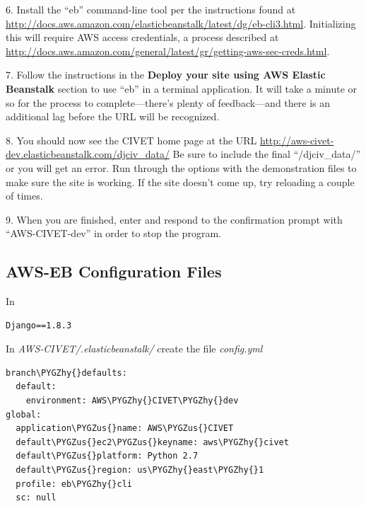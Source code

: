 \documentclass[letterpaper,10pt,english]{sphinxmanual}
\def\PYGZus{\char`\_}
\def\PYGZhy{\char`\-}
\begin{document}
6. Install the “eb” command-line tool per the instructions found at
\href{http://docs.aws.amazon.com/elasticbeanstalk/latest/dg/eb-cli3.html}{http://docs.aws.amazon.com/elasticbeanstalk/latest/dg/eb-cli3.html}. Initializing this will require AWS access credentials, a
process described at \href{http://docs.aws.amazon.com/general/latest/gr/getting-aws-sec-creds.html}{http://docs.aws.amazon.com/general/latest/gr/getting-aws-sec-creds.html}.

7. Follow the instructions in the \textbf{Deploy your site using AWS Elastic Beanstalk} section to use “eb” in a terminal
application. It will take a minute or so for the  process to complete—there's plenty of feedback—and there is an
additional lag before the URL will be recognized.

8. You should now see the CIVET home page at the URL \href{http://aws-civet-dev.elasticbeanstalk.com/djciv\_data/}{http://aws-civet-dev.elasticbeanstalk.com/djciv\_data/} Be sure to include
the final “/djciv\_data/'' or you will get an error. Run through the options with the demonstration files to make sure
the site is working. If the site doesn't come up, try reloading a couple of times.

9. When you are finished, enter  and respond to the confirmation prompt with “AWS-CIVET-dev” in order to
stop the program.


\subsection{AWS-EB Configuration Files}
\label{appendix5:aws-eb-configuration-files}
In

\begin{Verbatim}[commandchars=\\\{\}]
Django==1.8.3
\end{Verbatim}

In \emph{AWS-CIVET/.elasticbeanstalk/} create the file \emph{config.yml}

\begin{Verbatim}[commandchars=\\\{\}]
branch\PYGZhy{}defaults:
  default:
    environment: AWS\PYGZhy{}CIVET\PYGZhy{}dev
global:
  application\PYGZus{}name: AWS\PYGZus{}CIVET
  default\PYGZus{}ec2\PYGZus{}keyname: aws\PYGZhy{}civet
  default\PYGZus{}platform: Python 2.7
  default\PYGZus{}region: us\PYGZhy{}east\PYGZhy{}1
  profile: eb\PYGZhy{}cli
  sc: null
\end{Verbatim}
\end{document}

